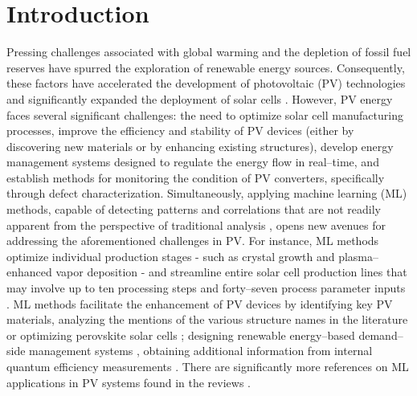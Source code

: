 \documentclass[a4paper,fleqn]{cas-sc}
\begin{document}
\section{Introduction}%
\par
Pressing challenges associated with global warming and the depletion of fossil fuel reserves have spurred the exploration of renewable energy sources. 
Consequently, these factors have accelerated the development of photovoltaic (PV) technologies and significantly expanded the deployment of solar cells \cite{Pata2024, Holechek2022}. 
However, PV energy faces several significant challenges: the need to optimize solar cell manufacturing processes, improve the efficiency and stability of PV devices (either by discovering new materials or by enhancing existing structures), develop energy management systems designed to regulate the energy flow in real--time, and establish methods for monitoring the condition of PV converters, specifically through defect characterization. 
Simultaneously, applying machine learning (ML) methods, capable of detecting patterns and correlations that are not readily apparent from the perspective of traditional analysis \cite{Park2022}, opens new avenues for addressing the aforementioned challenges in PV. 
For instance, ML methods optimize individual production stages - such as crystal growth \cite{Qi2020} and plasma--enhanced vapor deposition \cite{Rachdi2021} - and streamline entire solar cell production lines that may involve up to ten processing steps and forty--seven process parameter inputs \cite{Buratti2020}. 
ML methods facilitate the enhancement of PV devices by identifying key PV materials, analyzing the mentions of the various structure names in the literature \cite{Zhang2022} or optimizing perovskite solar cells \cite{Liu2023}; 
designing renewable energy--based demand--side management systems \cite{Asghar2023}, obtaining additional information from internal quantum efficiency measurements \cite{AbdullahVetter2025}. There are significantly more references on ML applications in PV systems found in the reviews \cite{DiSabatino2024, Datta2023, Jaiswal2023, Buratti2024, Bhatti2023}.
\end{document}
